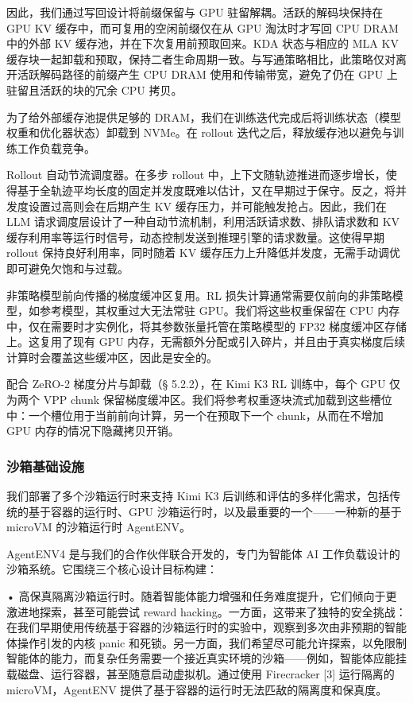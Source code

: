 因此，我们通过写回设计将前缀保留与 GPU 驻留解耦。活跃的解码块保持在 GPU KV 缓存中，而可复用的空闲前缀仅在从 GPU 淘汰时才写回 CPU DRAM 中的外部 KV 缓存池，并在下次复用前预取回来。KDA 状态与相应的 MLA KV 缓存块一起卸载和预取，保持二者生命周期一致。与写通策略相比，此策略仅对离开活跃解码路径的前缀产生 CPU DRAM 使用和传输带宽，避免了仍在 GPU 上驻留且活跃的块的冗余 CPU 拷贝。

为了给外部缓存池提供足够的 DRAM，我们在训练迭代完成后将训练状态（模型权重和优化器状态）卸载到 NVMe。在 rollout 迭代之后，释放缓存池以避免与训练工作负载竞争。

Rollout 自动节流调度器。在多步 rollout 中，上下文随轨迹推进而逐步增长，使得基于全轨迹平均长度的固定并发度既难以估计，又在早期过于保守。反之，将并发度设置过高则会在后期产生 KV 缓存压力，并可能触发抢占。因此，我们在 LLM 请求调度层设计了一种自动节流机制，利用活跃请求数、排队请求数和 KV 缓存利用率等运行时信号，动态控制发送到推理引擎的请求数量。这使得早期 rollout 保持良好利用率，同时随着 KV 缓存压力上升降低并发度，无需手动调优即可避免欠饱和与过载。

非策略模型前向传播的梯度缓冲区复用。RL 损失计算通常需要仅前向的非策略模型，如参考模型，其权重过大无法常驻 GPU。我们将这些权重保留在 CPU 内存中，仅在需要时才实例化，将其参数张量托管在策略模型的 FP32 梯度缓冲区存储上。这复用了现有 GPU 内存，无需额外分配或引入碎片，并且由于真实梯度后续计算时会覆盖这些缓冲区，因此是安全的。

配合 ZeRO-2 梯度分片与卸载（§ 5.2.2），在 Kimi K3 RL 训练中，每个 GPU 仅为两个 VPP chunk 保留梯度缓冲区。我们将参考权重逐块流式加载到这些槽位中：一个槽位用于当前前向计算，另一个在预取下一个 chunk，从而在不增加 GPU 内存的情况下隐藏拷贝开销。

\subsubsection{沙箱基础设施}\label{sandbox-infrastructure}

我们部署了多个沙箱运行时来支持 Kimi K3 后训练和评估的多样化需求，包括传统的基于容器的运行时、GPU 沙箱运行时，以及最重要的一个——一种新的基于 microVM 的沙箱运行时 AgentENV。

AgentENV4 是与我们的合作伙伴联合开发的，专门为智能体 AI 工作负载设计的沙箱系统。它围绕三个核心设计目标构建：

• 高保真隔离沙箱运行时。随着智能体能力增强和任务难度提升，它们倾向于更激进地探索，甚至可能尝试 reward hacking。一方面，这带来了独特的安全挑战：在我们早期使用传统基于容器的沙箱运行时的实验中，观察到多次由非预期的智能体操作引发的内核 panic 和死锁。另一方面，我们希望尽可能允许探索，以免限制智能体的能力，而复杂任务需要一个接近真实环境的沙箱——例如，智能体应能挂载磁盘、运行容器，甚至随意启动虚拟机。通过使用 Firecracker {[}3{]} 运行隔离的 microVM，AgentENV 提供了基于容器的运行时无法匹敌的隔离度和保真度。

